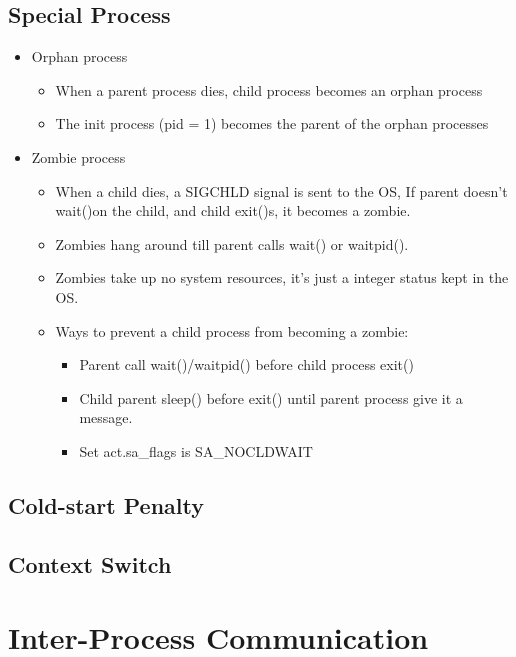 \documentclass[12pt]{article}
\begin{document}
\subsection{Special Process}
\begin{itemize}
    \item Orphan process \begin{itemize}
        \item When a parent process dies, child process becomes an orphan process
        \item The init process (pid = 1) becomes the parent of the orphan processes
    \end{itemize}
    \item Zombie process \begin{itemize}
        \item When a child dies, a SIGCHLD signal is sent to the OS, If parent doesn’t wait()on the child, and child exit()s, it becomes a zombie.
        \item Zombies hang around till parent calls wait() or waitpid().
        \item Zombies take up no system resources, it's just a integer status kept in the OS.
        \item Ways to prevent a child process from becoming a zombie: \begin{itemize}
            \item Parent call wait()/waitpid() before child process exit()
            \item Child parent sleep() before exit() until parent process give it a message.
            \item Set act.sa\_flags is SA\_NOCLDWAIT
        \end{itemize}
    \end{itemize}
\end{itemize}

\subsection{Cold-start Penalty}
\subsection{Context Switch}

\section{Inter-Process Communication}
\end{document}
